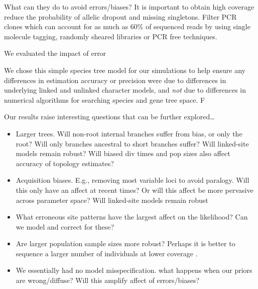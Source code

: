 What can they do to avoid errors/biases?
It is important to obtain high coverage reduce the probability of allelic dropout
and missing singletons. 
Filter PCR clones which can account for as much as 60\% of sequenced reads 
\citep{andrewsHarnessingPowerRADseq2016; smithBiasedEstimatesClonal2014} by using single molecule tagging, randomly sheared libraries or PCR free
techniques.


We evaluated the impact of error 


We chose this simple species tree model for our simulations to help ensure any
differences in estimation accuracy or precision were due to differences in
underlying linked and unlinked character models,
and \emph{not} due to differences in numerical algorithms for searching species
and gene tree space.
F

Our results raise interesting questions that can be further explored\ldots
\begin{itemize}
    \item Larger trees. Will non-root internal branches suffer from bias, or
        only the root? Will only branches ancestral to short branches suffer?
        Will linked-site models remain robust?
        Will biased div times and pop sizes also affect accuracy of topology
        estimates?
    \item Acquisition biases. E.g., removing most variable loci to avoid
        paralogy. Will this only have an affect at recent times? Or will
        this affect be more pervasive across parameter space?
        Will linked-site models remain robust
    \item What erroneous site patterns have the largest affect on
        the likelihood? Can we model and correct for these?
    \item Are larger population sample sizes more robust? Perhaps it is better
        to sequence a larger number of individuals at lower coverage 
        \cite{fumagalliAssessingEffectSequencing2013}.
    \item We essentially had no model misspecification.
        what happens when our priors are wrong/diffuse?
        Will this amplify affect of errors/biases?
\end{itemize}

